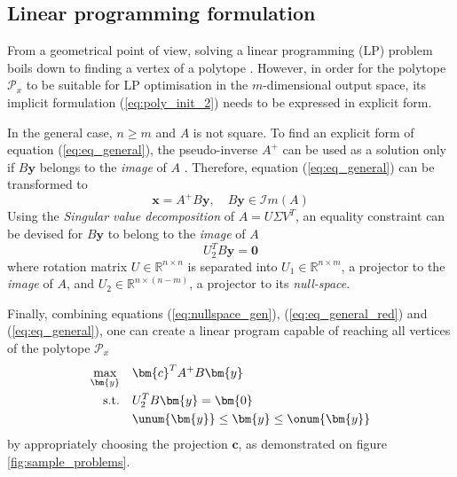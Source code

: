 



\subsection{Linear programming formulation}
\label{ch:lp_adapt}
From a geometrical point of view, solving a linear programming (LP) problem boils down to finding a vertex of a polytope \cite{vajda_gass_1964}. However, in order for the polytope $\mathcal{P}_x$ to be suitable for LP optimisation in the $m$-dimensional output space, its implicit formulation (\ref{eq:poly_init_2}) needs to be expressed in explicit form.

In the general case, $n\geq m$ and $A$ is not square. To find an explicit form of equation (\ref{eq:eq_general}), the pseudo-inverse $A^+$ can be used as a solution only if $B\bm{y}$ belongs to the \textit{image} of $A$ \cite{klema_singular_1980}. Therefore, equation (\ref{eq:eq_general}) can be transformed to 
\begin{equation}
    \bm{x} = A^{+} B \bm{y}, \quad B\bm{y} \in \mathcal{I}m(A)
    \label{eq:eq_general_red}
\end{equation} 
Using the \textit{Singular value decomposition} \cite{klema_singular_1980} of  $A = U\Sigma V^T$, an equality constraint can be devised for $B\bm{y}$ to belong to the \textit{image} of $A$
\begin{equation}
    U_2^TB\bm{y} = \bm{0}
    \label{eq:nullspace_gen}
\end{equation}
where rotation matrix $U \in \mathbb{R}^{n\times n }$ is separated into  $U_1\in \mathbb{R}^{n\times m}$, a projector to the  \textit{image} of $A$, and $U_2\in \mathbb{R}^{n\times(n-m)}$, a projector to its \textit{null-space}.

Finally, combining equations (\ref{eq:nullspace_gen}), (\ref{eq:eq_general_red}) and (\ref{eq:eq_general}), one can create a linear program \cite{vajda_gass_1964} capable of reaching all  vertices of the polytope $\mathcal{P}_x$
\begin{equation}
\begin{aligned}
    \max_{\bm{y}} \quad &  \bm{c}^TA^{+}B\bm{y} \\
     \textrm{s.t.} \quad &  U_2^TB\bm{y} = \bm{0} \\
          & \unum{\bm{y}} \leq \bm{y} \leq \onum{\bm{y}} \\
\end{aligned}
\label{eq:lin_prog}
\end{equation}
by appropriately choosing the projection $\bm{c}$, as demonstrated on figure \ref{fig:sample_problems}.


